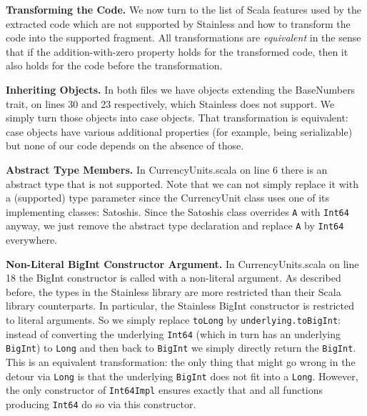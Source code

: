 \documentclass[runningheads]{llncs}
\renewcommand{\paragraph}{\textbf}%
\begin{document}
\paragraph{Transforming the Code.} We now turn to the list of Scala
features used by the extracted code which are not supported by
Stainless and how to transform the code into the supported fragment.
All transformations are \emph{equivalent} in the sense that if the
addition-with-zero property holds for the transformed code, then it
also holds for the code before the transformation.

\paragraph{Inheriting Objects.} In both files we have objects
extending the BaseNumbers trait, on lines 30 and 23 respectively,
which Stainless does not support. We simply turn those objects into
case objects. That transformation is equivalent: case objects have
various additional properties (for example, being serializable) but
none of our code depends on the absence of those.

\paragraph{Abstract Type Members.} In CurrencyUnits.scala on line 6
there is an abstract type that is not supported. Note that we can not
simply replace it with a (supported) type parameter since the
CurrencyUnit class uses one of its implementing classes:
Satoshis. Since the Satoshis class overrides \texttt{A} with \texttt{Int64} anyway, we
just remove the abstract type declaration and replace \texttt{A} by \texttt{Int64}
everywhere.

\paragraph{Non-Literal BigInt Constructor Argument.} In
CurrencyUnits.scala on line 18 the BigInt constructor is called with a
non-literal argument. As described before, the types in the Stainless
library are more restricted than their Scala library counterparts. In
particular, the Stainless BigInt constructor is restricted to literal
arguments. So we simply replace \texttt{toLong} by
\texttt{underlying.toBigInt}: instead of converting the underlying
\texttt{Int64} (which in turn has an underlying \texttt{BigInt}) to
\texttt{Long} and then back to \texttt{BigInt} we simply directly
return the \texttt{BigInt}. This is an equivalent transformation: the
only thing that might go wrong in the detour via \texttt{Long} is that
the underlying \texttt{BigInt} does not fit into a
\texttt{Long}. However, the only constructor of \texttt{Int64Impl}
ensures exactly that and all functions producing \texttt{Int64} do so
via this constructor.
\end{document}
